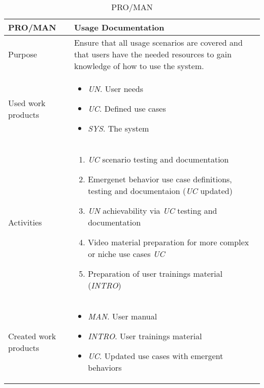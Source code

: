 \begin{table}[]
\begin{tabular}{l|p{}}
\hline
\textbf{PRO/MAN}               & \textbf{Usage Documentation} \\ \hline
Purpose & Ensure that all usage scenarios are covered and that users have the needed resources to gain knowledge of how to use the system. \\ \hline
Used work products    &      
\begin{itemize}
    \item \textit{UN}. User needs
    \item \textit{UC}. Defined use cases
    \item \textit{SYS}. The system
\end{itemize}
\\ \hline
Activities            &   
\begin{enumerate}
   \item \textit{UC} scenario testing and documentation
   \item Emergenet behavior use case definitions, testing and documentaion (\textit{UC} updated)
   \item \textit{UN} achievability via \textit{UC} testing and documentation
   \item Video material preparation for more complex or niche use cases \textit{UC}
   \item Preparation of user trainings material (\textit{INTRO})
\end{enumerate}
\\ \hline
Created work products &     
\begin{itemize}
    \item \textit{MAN}. User manual
    \item \textit{INTRO}. User trainings material
    \item \textit{UC}. Updated use cases with emergent behaviors
\end{itemize}
\end{tabular}
\caption{PRO/MAN}
\label{pro/man}
\end{table}


